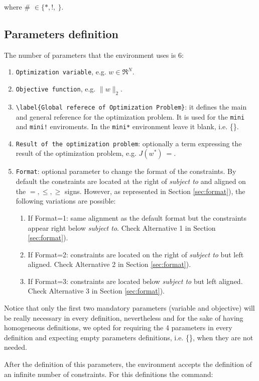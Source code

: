 \documentclass[]{report}
\begin{document}
\noindent where \# $\in \{*, !, ~ \}$.
\subsection{Parameters definition}
The number of parameters that the environment uses is 6:

\begin{enumerate}
	\item \verb|Optimization variable|, e.g. $w \in \Re^N$.
	\item \verb|Objective function|, e.g. $\|w\|_2$.
	\item \verb|\label{Global referece of Optimization Problem}|: it defines the main and general reference for the optimization problem. It is used for the \verb|mini| and \verb|mini!| enviroments. In the \verb|mini*| environment leave it blank, i.e. \{\}.   
	\item \verb|Result of the optimization problem|: optionally a term expressing the result of the optimization problem, e.g. $J(w^*)~=$.
	\item \verb|Format|: optional parameter to change the format of the constraints. By default the constraints are located at the right of \textit{subject to} and aligned on the $=,\leq,\geq$ signs. However, as represented in Section \ref{sec:format}), the following variations are possible:
	\begin{enumerate}
		\item If Format=1: same alignment as the default format but the constraints appear right below \textit{subject to}. Check  Alternative 1 in Section \ref{sec:format}).
		\item If Format=2: constraints are located on the right of \textit{subject to} but left aligned. Check  Alternative 2 in Section \ref{sec:format}).
		\item If Format=3: constraints are located below \textit{subject to} but left aligned. Check  Alternative 3 in Section \ref{sec:format}).
	\end{enumerate}

\end{enumerate}

\noindent Notice that only the first two mandatory parameters (variable and objective) will be really necessary in every definition, nevertheless and for the sake of having homogeneous definitions, we opted for requiring the 4 parameters in every definition and expecting empty parameters definitions, i.e. \{\}, when they are not needed.


After the definition of this parameters, the environment accepts the definition of an infinite number of constraints. For this definitions the command:
~\\
\end{document}
